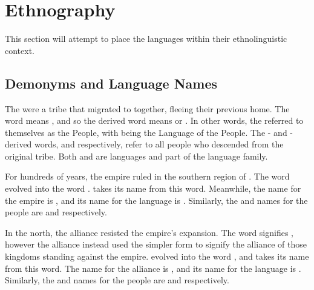 \section{Ethnography}
\label{sec:tvk-ethnography}

This section will attempt to place the \langtvk{} languages within their ethnolinguistic context.

\subsection{Demonyms and Language Names}
\label{subsec:tvk-demonyms}

The \peoptvk{} were a tribe that migrated to \landn{} together, fleeing their previous home. The \langtvk{} word   means , and so the derived word \fw{\npeoptvk}  means  or . In other words, the \peoptvk{} referred to themselves as the People, with \fw{\nlangtvk} being the Language of the People. The \langank- and \langrdk-derived words,   and   respectively, refer to all people who descended from the original \peoptvk{} tribe. Both \langank{} and \langrdk{} are \peoptvk{} languages and part of the \langtvk{} language family.

For hundreds of years, the empire ruled in the southern region of \landn. The \langtvk{} word    evolved into the \langank{} word  . \fw{\nlangank}   takes its name from this word. Meanwhile, the \langrdk{} name for the empire is  , and its name for the \langank{} language is  . Similarly, the \langank{} and \langrdk{} names for the \langank{} people are   and   respectively.

In the north, the alliance resisted the empire's expansion. The \langtvk{} word   signifies , however the alliance instead used the simpler form    to signify the alliance of those kingdoms standing against the empire.  evolved into the \langrdk{} word  , and \fw{\nlangrdk}   takes its name from this word. The \langank{} name for the alliance is  , and its name for the \langrdk{} language is  . Similarly, the \langrdk{} and \langank{} names for the \langrdk{} people are   and   respectively.